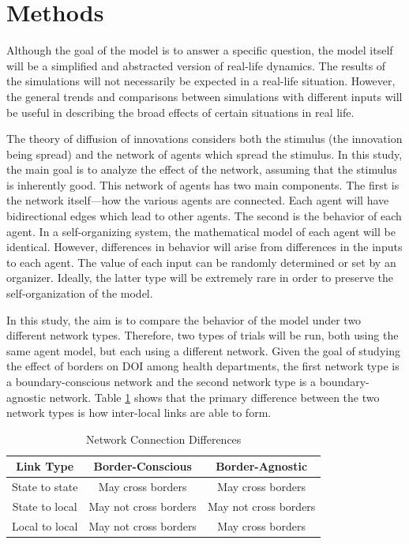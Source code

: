 \documentclass[12pt]{article}
\begin{document}
\section{Methods}
Although the goal of the model is to answer a specific question, the model itself will be a simplified and abstracted version of real-life dynamics. The results of the simulations will not necessarily be expected in a real-life situation. However, the general trends and comparisons between simulations with different inputs will be useful in describing the broad effects of certain situations in real life.

The theory of diffusion of innovations considers both the stimulus (the innovation being spread) and the network of agents which spread the stimulus. In this study, the main goal is to analyze the effect of the network, assuming that the stimulus is inherently good. This network of agents has two main components. The first is the network itself—how the various agents are connected. Each agent will have bidirectional edges which lead to other agents. The second is the behavior of each agent. In a self-organizing system, the mathematical model of each agent will be identical. However, differences in behavior will arise from differences in the inputs to each agent. The value of each input can be randomly determined or set by an organizer. Ideally, the latter type will be extremely rare in order to preserve the self-organization of the model.

In this study, the aim is to compare the behavior of the model under two different network types. Therefore, two types of trials will be run, both using the same agent model, but each using a different network. Given the goal of studying the effect of borders on DOI among health departments, the first network type is a boundary-conscious network and the second network type is a boundary-agnostic network. Table \ref{tab:Connections} shows that the primary difference between the two network types is how inter-local links are able to form. 
\begin{table}[h!]
    \caption{Network Connection Differences}
    \centering
    \begin{tabular}{|c|c|c|}
    \hline
        \textbf{Link Type} & \textbf{Border-Conscious} & \textbf{Border-Agnostic} \\
        \hline
State to state	& May cross borders	& May cross borders \\
\hline
State to local	&May not cross borders	&May not cross borders \\
\hline
Local to local	&May not cross borders	&May cross borders \\
\hline
    \end{tabular}

    \label{tab:Connections}
\end{table}
\end{document}
